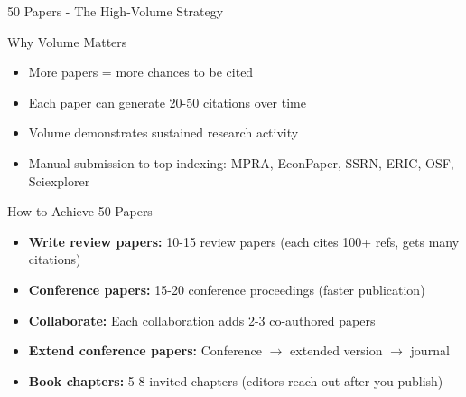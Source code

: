 \documentclass[11pt]{beamer}
\begin{document}
	\begin{frame}{50 Papers - The High-Volume Strategy}
		\scriptsize
		\begin{block}{Why Volume Matters}
			\begin{itemize}
				\item More papers = more chances to be cited
				\item Each paper can generate 20-50 citations over time
				\item Volume demonstrates sustained research activity
				\item Manual submission to top indexing: MPRA, EconPaper, SSRN, ERIC, OSF, Sciexplorer
			\end{itemize}
		\end{block}
		\begin{block}{How to Achieve 50 Papers}
			\begin{itemize}
				\item \textbf{Write review papers:} 10-15 review papers (each cites 100+ refs, gets many citations)
				\item \textbf{Conference papers:} 15-20 conference proceedings (faster publication)
				\item \textbf{Collaborate:} Each collaboration adds 2-3 co-authored papers
				\item \textbf{Extend conference papers:} Conference $\rightarrow$ extended version $\rightarrow$ journal
				\item \textbf{Book chapters:} 5-8 invited chapters (editors reach out after you publish)
			\end{itemize}
		\end{block}
	\end{frame}
	
\end{document}
